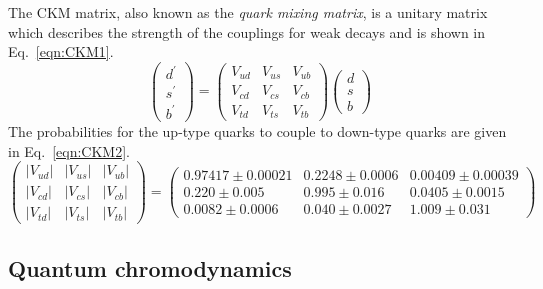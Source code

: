 The CKM matrix, also known as the \emph{quark mixing matrix}, is a unitary matrix which describes the strength of the couplings for weak decays and is shown in Eq.~\ref{eqn:CKM1}. 
\begin{equation}
\label{eqn:CKM1}
{\begin{pmatrix}
d^{\prime }\\
s^{\prime }\\
b^{\prime }
\end{pmatrix}}
=
{\begin{pmatrix}
V_{ud}&V_{us}&V_{ub}\\
V_{cd}&V_{cs}&V_{cb}\\
V_{td}&V_{ts}&V_{tb}
\end{pmatrix}}
{\begin{pmatrix}d\\s\\b
\end{pmatrix}}
\end{equation}
The probabilities for the up-type quarks to couple to down-type quarks are given in Eq.~\ref{eqn:CKM2}.
\begin{equation}
\label{eqn:CKM2}
{\begin{pmatrix}
|V_{ud}|&|V_{us}|&|V_{ub}|\\|V_{cd}|&|V_{cs}|&|V_{cb}|\\|V_{td}|&|V_{ts}|&|V_{tb}|
\end{pmatrix}}
=
{\begin{pmatrix}0.97417\pm 0.00021 & 0.2248\pm 0.0006 & 0.00409\pm{0.00039}\\
0.220\pm 0.005 & 0.995\pm 0.016 & 0.0405\pm{0.0015}\\
0.0082\pm{0.0006} & 0.040\pm{0.0027}&1.009\pm0.031
\end{pmatrix}}
\end{equation}



\subsection{Quantum chromodynamics}

